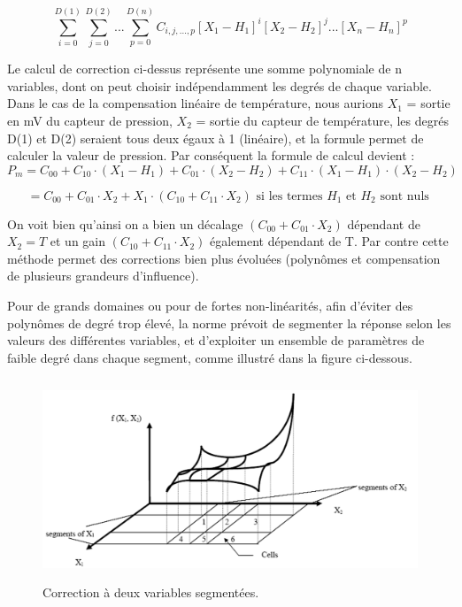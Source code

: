 \begin{equation}
\displaystyle\sum_{i=0}^{D(1)}
\displaystyle\sum_{j=0}^{D(2)} \text{...}
\displaystyle\sum_{p=0}^{D(n)} C_{i,j,...,p} [X_1-H_1]^i[X_2-H_2]^j \text{...} [X_n-H_n]^p
\end{equation}

Le calcul de correction ci-dessus représente une somme polynomiale de n variables, dont on peut choisir indépendamment les degrés de chaque variable. Dans le cas de la compensation linéaire de température, nous aurions $X_1$ = sortie en mV du capteur de pression, $X_2$ = sortie du capteur de température, les degrés D(1) et D(2) seraient tous deux égaux à 1 (linéaire), et la formule permet de calculer la valeur de pression. Par conséquent la formule de calcul devient :
\begin{equation}
P_m =C_{00} + C_{10} \cdot (X_1-H_1)+C_{01} \cdot (X_2-H_2) + C_{11}\cdot(X_1-H_1) \cdot (X_2-H_2)
\end{equation}

\begin{equation*}
= C_{00} + C_{01} \cdot X_2 + X_1 \cdot (C_{10} + C_{11} \cdot X_2)  \text{ si les termes $H_1$ et $H_2$ sont nuls }
\end{equation*}

On voit bien qu'ainsi on a bien un décalage $(C_{00} + C_{01} \cdot X_2)$ dépendant de $X_2=T$ et un gain $(C_{10} + C_{11} \cdot X_2)$ également dépendant de T. Par contre cette méthode permet des corrections bien plus évoluées (polynômes et compensation de plusieurs grandeurs d'influence).

Pour de grands domaines ou pour de fortes non-linéarités, afin d'éviter des polynômes de degré trop élevé, la norme prévoit de segmenter la réponse selon les valeurs des différentes variables, et d'exploiter un ensemble de paramètres de faible degré dans chaque segment, comme illustré dans la figure ci-dessous.

\begin{figure}
\centering
\includegraphics[height=6cm]{assets/figures/3_6_Correction_a_2_variables_segementees.PNG}
\caption{Correction à deux variables segmentées.}
\label{fig:Correction_a_2_variables_segementees}
\end{figure}

